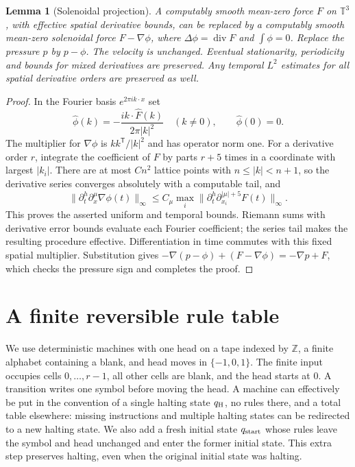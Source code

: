 \documentclass[11pt]{article}
\newtheorem{lemma}[theorem]{Lemma}
\theoremstyle{remark}\newtheorem{remark}[theorem]{Remark}
\newcommand{\T}{\mathbb T}\newcommand{\R}{\mathbb R}
\DeclareMathOperator{\diver}{div}
\begin{document}
\begin{lemma}[Solenoidal projection]\label{lem:projection}
A computably smooth mean-zero force $F$ on $\T^3$, with effective
spatial derivative bounds, can be replaced by a computably smooth
mean-zero solenoidal force $F-\nabla\phi$, where
$\Delta\phi=\diver F$ and $\int\phi=0$. Replace the pressure $p$
by $p-\phi$. The velocity is unchanged. Eventual stationarity,
periodicity and bounds for mixed derivatives are preserved. Any
temporal $L^2$ estimates for all spatial derivative orders are preserved
as well.
\end{lemma}
\begin{proof}
In the Fourier basis $e^{2\pi i k\cdot x}$ set
\[
 \widehat\phi(k)=-\frac{i k\cdot\widehat F(k)}{2\pi|k|^2}
 \quad(k\ne0),\qquad \widehat\phi(0)=0.
\]
The multiplier for $\nabla\phi$ is $kk^{\mathsf T}/|k|^2$ and has
operator norm one. For a derivative order $r$, integrate the coefficient
of $F$ by parts $r+5$ times in a coordinate with largest $|k_i|$.
There are at most $C n^2$ lattice points with $n\le|k|<n+1$, so the
derivative series converges absolutely with a computable tail, and
\[
 \|\partial_t^h\partial_x^\mu\nabla\phi(t)\|_\infty
 \le C_\mu\max_i
 \|\partial_t^h\partial_{x_i}^{|\mu|+5}F(t)\|_\infty.
\]
This proves the asserted uniform and temporal bounds. Riemann sums
with derivative error bounds evaluate each Fourier coefficient; the
series tail makes the resulting procedure effective. Differentiation
in time commutes with this fixed spatial multiplier. Substitution gives
$-\nabla(p-\phi)+(F-\nabla\phi)=-\nabla p+F$, which checks the
pressure sign and completes the proof.
\end{proof}

\section{A finite reversible rule table}\label{sec:compiler}

We use deterministic machines with one head on a tape indexed by
$\mathbb Z$, a finite alphabet containing a blank, and head moves in
$\{-1,0,1\}$.  The finite input occupies cells $0,\ldots,r-1$, all
other cells are blank, and the head starts at $0$.  A transition writes
one symbol before moving the head.  A machine can effectively be put
in the convention of a single halting state $q_{\rm H}$, no rules
there, and a total table elsewhere: missing instructions and multiple
halting states can be redirected to a new halting state.  We also add
a fresh initial state $q_{\rm start}$ whose rules leave the symbol and
head unchanged and enter the former initial state.  This extra step
preserves halting, even when the original initial state was halting.
\end{document}
